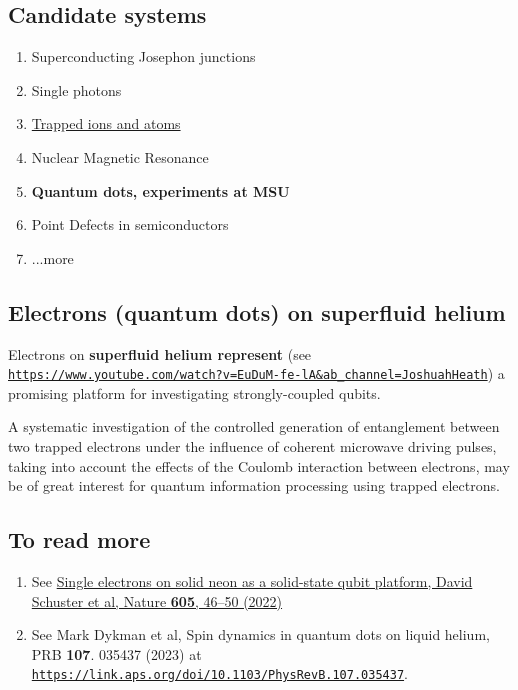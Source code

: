 \documentclass[%
oneside,                 %
final,                   %
10pt]{article}
\begin{document}
\subsection{Candidate systems}

\begin{block}{}
\begin{enumerate}
\item Superconducting Josephon junctions

\item Single photons

\item \href{{https://journals.aps.org/rmp/pdf/10.1103/RevModPhys.93.025001}}{Trapped ions and atoms}

\item Nuclear Magnetic Resonance

\item \textbf{Quantum dots, experiments at MSU}

\item Point Defects in semiconductors

\item ...more
\end{enumerate}

\noindent
\end{block}

\subsection{Electrons (quantum dots) on superfluid helium}

Electrons on \textbf{superfluid helium represent} (see \href{{https://www.youtube.com/watch?v=EuDuM-fe-lA&ab_channel=JoshuahHeath}}{\nolinkurl{https://www.youtube.com/watch?v=EuDuM-fe-lA&ab_channel=JoshuahHeath}}) a promising platform for investigating
strongly-coupled qubits.

A systematic investigation of the
controlled generation of entanglement between two trapped electrons
under the influence of coherent microwave driving pulses, taking into
account the effects of the Coulomb interaction between electrons, may be of great interest for quantum information processing using
trapped electrons.

\subsection{To read more}

\begin{enumerate}
\item See \href{{https://www.nature.com/articles/s41586-022-04539-x}}{Single electrons on solid neon as a solid-state qubit platform, David Schuster et al, Nature \textbf{605}, 46–50 (2022)}

\item See Mark Dykman et al, Spin dynamics in quantum dots on liquid helium, PRB \textbf{107}. 035437 (2023) at \href{{https://link.aps.org/doi/10.1103/PhysRevB.107.035437}}{\nolinkurl{https://link.aps.org/doi/10.1103/PhysRevB.107.035437}}.
\end{enumerate}
\end{document}
